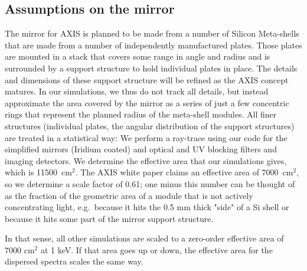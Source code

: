 \documentclass[12pt]{spieman}  %
\begin{document}
\begin{spacing}{1}
\subsection{Assumptions on the mirror}
\label{sect:PSF}
The mirror for AXIS is planned to be made from a number of Silicon Meta-shells that are made from a number of independently manufactured plates\cite{10.1117/1.JATIS.5.2.021012}. Those plates are mounted in a stack that covers some range in angle and radius and is surrounded by a support structure to hold individual plates in place. The details and dimensions of these support structure will be refined as the AXIS concept matures. In our simulations, we thus do not track all details, but instead approximate the area covered by the mirror as a series of just a few concentric rings that represent the planned radius of the meta-shell modules. All finer structures (individual plates, the angular distribution of the support structures) are treated in a statistical way: We perform a ray-trace using our code for the simplified mirrors (Iridium coated) and optical and UV blocking filters and imaging detectors. We determine the effective area that our simulations gives, which is 11500~cm$^2$. The AXIS white paper\cite{2019BAAS...51g.107M} claims an effective area of 7000~cm$^2$, so we determine a scale factor of 0.61; one minus this number can be thought of as the fraction of the geometric area of a module that is not actively concentrating light, e.g.\ because it hits the 0.5 mm thick "side" of a Si shell or because it hits some part of the mirror support structure.

In that sense, all other simulations are scaled to a zero-order effective area of 7000 cm$^2$ at 1 keV. If that area goes up or down, the effective area for the dispersed spectra scales the same way.



\end{spacing}
\end{document}
